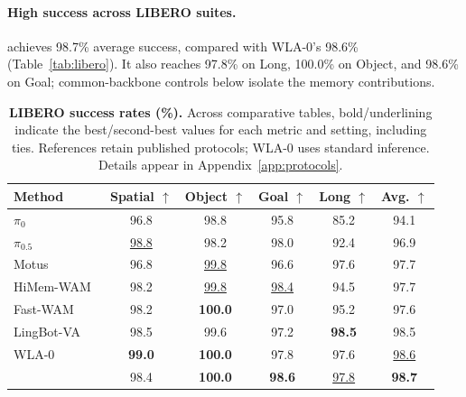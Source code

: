 \paragraph{High success across LIBERO suites.}
\method{} achieves 98.7\% average success, compared with WLA-0's 98.6\% (Table~\ref{tab:libero}).
It also reaches 97.8\% on Long, 100.0\% on Object, and 98.6\% on Goal; common-backbone controls below isolate the memory contributions.
\begin{table}[htbp]
\vspace{-0.3cm}
\centering
\small
\setlength{\tabcolsep}{9.0pt}
\caption{\textbf{LIBERO success rates (\%).} Across comparative tables, bold/underlining indicate the best/second-best values for each metric and setting, including ties. References retain published protocols; WLA-0 uses standard inference. Details appear in Appendix~\ref{app:protocols}.}
\label{tab:libero}
\label{tab:main}
\begin{tabular}{@{}lccccc@{}}
\toprule
Method & Spatial $\uparrow$ & Object $\uparrow$ & Goal $\uparrow$ & Long $\uparrow$ & Avg. $\uparrow$ \\
\midrule
$\pi_0$~\citep{black2025pi0} & 96.8 & 98.8 & 95.8 & 85.2 & 94.1 \\
$\pi_{0.5}$~\citep{intelligence2025pi05} & \underline{98.8} & 98.2 & 98.0 & 92.4 & 96.9 \\
Motus~\citep{bi2025motus} & 96.8 & \underline{99.8} & 96.6 & 97.6 & 97.7 \\
HiMem-WAM~\citep{sun2026himem} & 98.2 & \underline{99.8} & \underline{98.4} & 94.5 & 97.7 \\
Fast-WAM~\citep{yuan2026fastwam} & 98.2 & \textbf{100.0} & 97.0 & 95.2 & 97.6 \\
LingBot-VA~\citep{li2026lingbotva} & 98.5 & 99.6 & 97.2 & \textbf{98.5} & 98.5 \\
WLA-0~\citep{yang2026wla} & \textbf{99.0} & \textbf{100.0} & 97.8 & 97.6 & \underline{98.6} \\
\midrule
\rowcolor{blue!7}
\method{} & 98.4 & \textbf{100.0} & \textbf{98.6} & \underline{97.8} & \textbf{98.7} \\
\bottomrule
\end{tabular}
\end{table}
